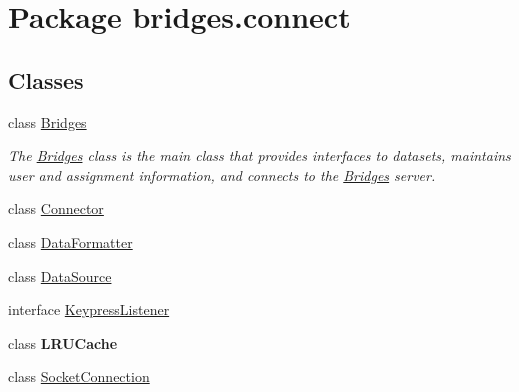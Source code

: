 \hypertarget{namespacebridges_1_1connect}{}\section{Package bridges.\+connect}
\label{namespacebridges_1_1connect}
\subsection*{Classes}
\begin{DoxyCompactItemize}
\item 
class \hyperlink{classbridges_1_1connect_1_1_bridges}{Bridges}
\begin{DoxyCompactList}\small\item\em The \hyperlink{classbridges_1_1connect_1_1_bridges}{Bridges} class is the main class that provides interfaces to datasets, maintains user and assignment information, and connects to the \hyperlink{classbridges_1_1connect_1_1_bridges}{Bridges} server. \end{DoxyCompactList}\item 
class \hyperlink{classbridges_1_1connect_1_1_connector}{Connector}
\item 
class \hyperlink{classbridges_1_1connect_1_1_data_formatter}{Data\+Formatter}
\item 
class \hyperlink{classbridges_1_1connect_1_1_data_source}{Data\+Source}
\item 
interface \hyperlink{interfacebridges_1_1connect_1_1_keypress_listener}{Keypress\+Listener}
\item 
class {\bfseries L\+R\+U\+Cache}
\item 
class \hyperlink{classbridges_1_1connect_1_1_socket_connection}{Socket\+Connection}
\end{DoxyCompactItemize}
